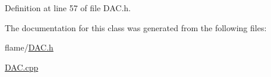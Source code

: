 Definition at line 57 of file D\-A\-C.\-h.



The documentation for this class was generated from the following files\-:\begin{DoxyCompactItemize}
\item 
flame/\hyperlink{_d_a_c_8h}{D\-A\-C.\-h}\item 
\hyperlink{_d_a_c_8cpp}{D\-A\-C.\-cpp}\end{DoxyCompactItemize}
